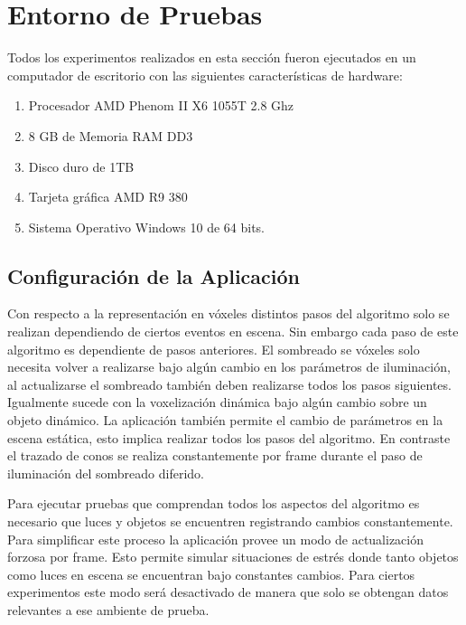 \section{Entorno de Pruebas}
Todos los experimentos realizados en esta sección fueron ejecutados en un computador de escritorio con las siguientes características de hardware:

\begin{enumerate}
    \item Procesador AMD Phenom II X6 1055T 2.8 Ghz
    \item 8 GB de Memoria RAM DD3
    \item Disco duro de 1TB 
    \item Tarjeta gráfica AMD R9 380
    \item Sistema Operativo Windows 10 de 64 bits.
\end{enumerate}

\subsection{Configuración de la Aplicación}

Con respecto a la representación en vóxeles distintos pasos del algoritmo solo se realizan dependiendo de ciertos eventos en escena. Sin embargo cada paso de este algoritmo es dependiente de pasos anteriores. El sombreado se vóxeles solo necesita volver a realizarse bajo algún cambio en los parámetros de iluminación, al actualizarse el sombreado también deben realizarse todos los pasos siguientes. Igualmente sucede con la voxelización dinámica bajo algún cambio sobre un objeto dinámico. La aplicación también permite el cambio de parámetros en la escena estática, esto implica realizar todos los pasos del algoritmo. En contraste el trazado de conos se realiza constantemente por frame durante el paso de iluminación del sombreado diferido.

Para ejecutar pruebas que comprendan todos los aspectos del algoritmo es necesario que luces y objetos se encuentren registrando cambios constantemente. Para simplificar este proceso la aplicación provee un modo de actualización forzosa por frame. Esto permite simular situaciones de estrés donde tanto objetos como luces en escena se encuentran bajo constantes cambios. Para ciertos experimentos este modo será desactivado de manera que solo se obtengan datos relevantes a ese ambiente de prueba.
